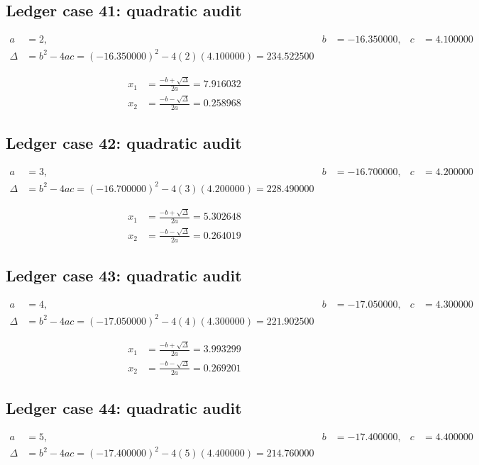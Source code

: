 \documentclass[11pt,a4paper]{article}
\begin{document}
\subsection{Ledger case 41: quadratic audit}
\begin{align}
a &= 2, & b &= -16.350000, & c &= 4.100000 \\
\Delta &= b^2-4ac = (-16.350000)^2 - 4(2)(4.100000) = 234.522500
\end{align}

\begin{align}
x_1 &= \frac{-b+\sqrt{\Delta}}{2a} = 7.916032 \\
x_2 &= \frac{-b-\sqrt{\Delta}}{2a} = 0.258968
\end{align}

\subsection{Ledger case 42: quadratic audit}
\begin{align}
a &= 3, & b &= -16.700000, & c &= 4.200000 \\
\Delta &= b^2-4ac = (-16.700000)^2 - 4(3)(4.200000) = 228.490000
\end{align}

\begin{align}
x_1 &= \frac{-b+\sqrt{\Delta}}{2a} = 5.302648 \\
x_2 &= \frac{-b-\sqrt{\Delta}}{2a} = 0.264019
\end{align}

\newpage

\subsection{Ledger case 43: quadratic audit}
\begin{align}
a &= 4, & b &= -17.050000, & c &= 4.300000 \\
\Delta &= b^2-4ac = (-17.050000)^2 - 4(4)(4.300000) = 221.902500
\end{align}

\begin{align}
x_1 &= \frac{-b+\sqrt{\Delta}}{2a} = 3.993299 \\
x_2 &= \frac{-b-\sqrt{\Delta}}{2a} = 0.269201
\end{align}

\subsection{Ledger case 44: quadratic audit}
\begin{align}
a &= 5, & b &= -17.400000, & c &= 4.400000 \\
\Delta &= b^2-4ac = (-17.400000)^2 - 4(5)(4.400000) = 214.760000
\end{align}
\end{document}

